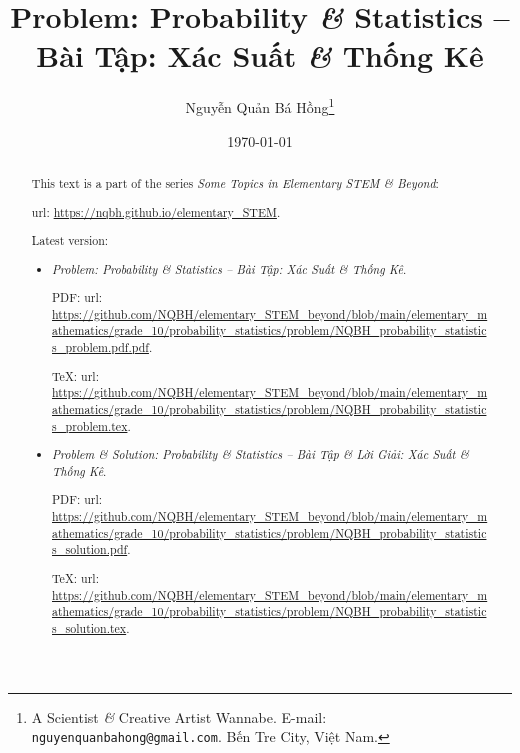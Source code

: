 \documentclass{article}
\title{Problem: Probability {\it\&} Statistics -- Bài Tập: Xác Suất {\it\&} Thống Kê}
\author{Nguyễn Quản Bá Hồng\footnote{A Scientist {\it\&} Creative Artist Wannabe. E-mail: {\tt nguyenquanbahong@gmail.com}. Bến Tre City, Việt Nam.}}
\date{\today}
\begin{document}
\maketitle
\begin{abstract}
	This text is a part of the series {\it Some Topics in Elementary STEM \& Beyond}:
	
	{\sc url}: \url{https://nqbh.github.io/elementary_STEM}.
	
	Latest version:
	\begin{itemize}
		\item {\it Problem: Probability \& Statistics -- Bài Tập: Xác Suất \& Thống Kê}.
		
		PDF: {\sc url}: \url{https://github.com/NQBH/elementary_STEM_beyond/blob/main/elementary_mathematics/grade_10/probability_statistics/problem/NQBH_probability_statistics_problem.pdf.pdf}.
		
		\TeX: {\sc url}: \url{https://github.com/NQBH/elementary_STEM_beyond/blob/main/elementary_mathematics/grade_10/probability_statistics/problem/NQBH_probability_statistics_problem.tex}.
		\item {\it Problem \& Solution: Probability \& Statistics -- Bài Tập \& Lời Giải: Xác Suất \& Thống Kê}.
		
		PDF: {\sc url}: \url{https://github.com/NQBH/elementary_STEM_beyond/blob/main/elementary_mathematics/grade_10/probability_statistics/problem/NQBH_probability_statistics_solution.pdf}.
		
		\TeX: {\sc url}: \url{https://github.com/NQBH/elementary_STEM_beyond/blob/main/elementary_mathematics/grade_10/probability_statistics/problem/NQBH_probability_statistics_solution.tex}.
	\end{itemize}
\end{abstract}
\tableofcontents

\end{document}
